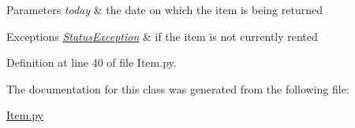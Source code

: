 \begin{DoxyParams}{Parameters}
{\em today} & the date on which the item is being returned \\
\hline
\end{DoxyParams}

\begin{DoxyExceptions}{Exceptions}
{\em \hyperlink{namespaceStatusException}{Status\+Exception}} & if the item is not currently rented \\
\hline
\end{DoxyExceptions}


Definition at line 40 of file Item.\+py.



The documentation for this class was generated from the following file\+:\begin{DoxyCompactItemize}
\item 
\hyperlink{Item_8py}{Item.\+py}\end{DoxyCompactItemize}
